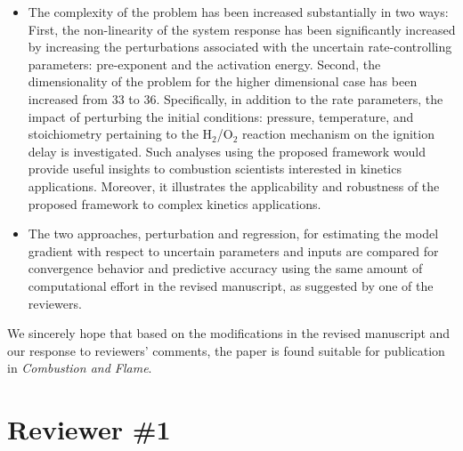 \documentclass[11pt,final]{article}
\begin{document}
\begin{itemize}

\item The complexity of the problem has been increased substantially in two ways: First, 
the non-linearity of the system response has been significantly increased by increasing
the perturbations associated with the uncertain rate-controlling parameters: pre-exponent
and the activation energy. Second, the dimensionality of the problem for the higher
dimensional case has been increased from 33 to 36.
Specifically, in addition to the rate parameters, the impact of
perturbing the initial conditions: pressure, temperature, and stoichiometry pertaining to the
H$_2$/O$_2$ reaction mechanism on the ignition delay is investigated. Such analyses using the
proposed framework would provide useful insights to combustion scientists interested in
kinetics applications. Moreover, it illustrates the applicability and robustness of the 
proposed framework to complex kinetics applications. 

\item The two approaches, perturbation and regression, for estimating the model gradient
with respect to uncertain parameters and inputs are compared for convergence behavior and
predictive accuracy using the same amount of
computational effort in the revised manuscript, as suggested by one of the reviewers. 

\end{itemize} 

We sincerely hope that based on the modifications in the revised manuscript and our 
response to reviewers' comments, the paper is found suitable for publication in
{\it Combustion and Flame}. 

\clearpage


\section*{Reviewer \#1}
\end{document}

